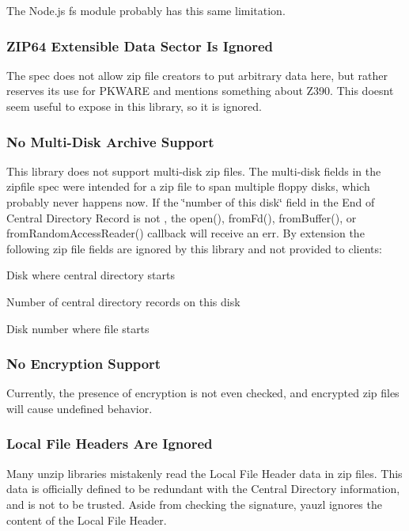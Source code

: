 The Node.\+js {\ttfamily fs} module probably has this same limitation.

\subsubsection*{Z\+I\+P64 Extensible Data Sector Is Ignored}

The spec does not allow zip file creators to put arbitrary data here, but rather reserves its use for P\+K\+W\+A\+RE and mentions something about Z390. This doesn\textquotesingle{}t seem useful to expose in this library, so it is ignored.

\subsubsection*{No Multi-\/\+Disk Archive Support}

This library does not support multi-\/disk zip files. The multi-\/disk fields in the zipfile spec were intended for a zip file to span multiple floppy disks, which probably never happens now. If the \char`\"{}number of this disk\char`\"{} field in the End of Central Directory Record is not {}, the {\ttfamily open()}, {\ttfamily from\+Fd()}, {\ttfamily from\+Buffer()}, or {\ttfamily from\+Random\+Access\+Reader()} {\ttfamily callback} will receive an {\ttfamily err}. By extension the following zip file fields are ignored by this library and not provided to clients\+:


\begin{DoxyItemize}
\item Disk where central directory starts
\item Number of central directory records on this disk
\item Disk number where file starts
\end{DoxyItemize}

\subsubsection*{No Encryption Support}

Currently, the presence of encryption is not even checked, and encrypted zip files will cause undefined behavior.

\subsubsection*{Local File Headers Are Ignored}

Many unzip libraries mistakenly read the Local File Header data in zip files. This data is officially defined to be redundant with the Central Directory information, and is not to be trusted. Aside from checking the signature, yauzl ignores the content of the Local File Header.

